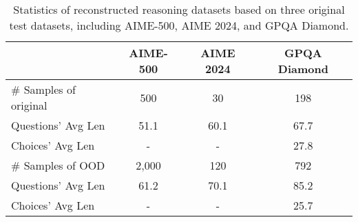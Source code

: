 



\begin{table}
\centering
\caption{Statistics of reconstructed reasoning datasets based on three original test datasets, including AIME-500, AIME 2024, and GPQA Diamond.}
\label{tab:data_statistics}
 \begin{adjustbox}{width=0.99\columnwidth}{
\begin{tabular}{lccc} 
\toprule
                             & AIME-500 & AIME 2024 & GPQA Diamond \\ 
\midrule
\# Samples of original  & 500      & 30        & 198                      \\
Questions' Avg Len       & 51.1     & 60.1      & 67.7                     \\
Choices' Avg Len         & -        & -         & 27.8                     \\ 
\hline
\# Samples of OOD & 2,000      & 120        & 792                      \\
Questions' Avg Len       & 61.2     & 70.1      & 85.2                     \\
Choices' Avg Len         & -        & -         & 25.7                     \\
\bottomrule
\end{tabular}}    \end{adjustbox}
\end{table}